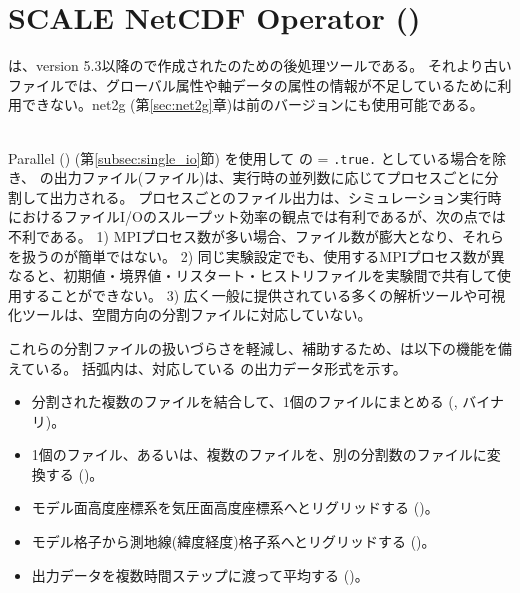 \section{SCALE NetCDF Operator (\sno)} \label{sec:sno}

 \hrulefill

\sno は、version 5.3以降の\scalelib で作成された\scalenetcdf のための後処理ツールである。
それより古い \scalenetcdf ファイルでは、グローバル属性や軸データの属性の情報が不足しているために利用できない。net2g (第\ref{sec:net2g}章)は前のバージョンにも使用可能である。

\noindent \hrulefill\\


Parallel \netcdf (\pnetcdf) (第\ref{subsec:single_io}節) を使用して
 の  = \verb|.true.| としている場合を除き、
\scalerm の出力ファイル(\scalenetcdf ファイル)は、実行時の並列数に応じてプロセスごとに分割して出力される。
プロセスごとのファイル出力は、シミュレーション実行時におけるファイルI/Oのスループット効率の観点では有利であるが、次の点では不利である。
1) MPIプロセス数が多い場合、ファイル数が膨大となり、それらを扱うのが簡単ではない。
2) 同じ実験設定でも、使用するMPIプロセス数が異なると、初期値・境界値・リスタート・ヒストリファイルを実験間で共有して使用することができない。
3) 広く一般に提供されている多くの解析ツールや可視化ツールは、空間方向の分割ファイルに対応していない。

これらの分割ファイルの扱いづらさを軽減し、補助するため、\sno は以下の機能を備えている。
括弧内は、対応している \sno の出力データ形式を示す。
\begin{itemize}
 \item 分割された複数のファイルを結合して、1個のファイルにまとめる (\scalenetcdf, \grads バイナリ)。
 \item 1個のファイル、あるいは、複数のファイルを、別の分割数のファイルに変換する (\scalenetcdf)。
 \item モデル面高度座標系を気圧面高度座標系へとリグリッドする (\scalenetcdf)。
 \item モデル格子から測地線(緯度経度)格子系へとリグリッドする (\scalenetcdf)。
 \item 出力データを複数時間ステップに渡って平均する (\scalenetcdf)。
\end{itemize}


